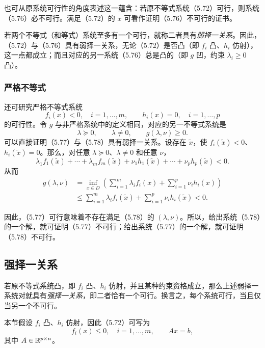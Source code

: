 也可从原系统可行性的角度表述这一蕴含：若原不等式系统（5.72）可行，则系统（5.76）必不可行。满足（5.72）的 $x$ 可看作证明（5.76）不可行的证书。

若两个不等式（和等式）系统至多有一个可行，就称二者具有\emph{弱择一关系}。因此，（5.72）与（5.76）具有弱择一关系，无论（5.72）是否凸（即 $f_i$ 凸、$h_i$ 仿射），这一点都成立；而且对应的另一系统（5.76）总是凸的（即 $g$ 凹，约束 $\lambda_i\ge0$ 凸）。

\subsubsection*{严格不等式}
还可研究严格不等式系统
\begin{equation}
f_i(x)<0,\quad i=1,\ldots,m,\qquad
h_i(x)=0,\quad i=1,\ldots,p\tag{5.77}
\end{equation}
的可行性。令 $g$ 与非严格系统中的定义相同，对应的另一不等式系统是
\begin{equation}
\lambda\succeq0,\qquad\lambda\ne0,\qquad g(\lambda,\nu)\ge0.\tag{5.78}
\end{equation}
可以直接证明（5.77）与（5.78）具有弱择一关系。设存在 $\widetilde x$，使 $f_i(\widetilde x)<0$、$h_i(\widetilde x)=0$。那么，对任意 $\lambda\succeq0$、$\lambda\ne0$ 和任意 $\nu$，
\[
\lambda_1 f_1(\widetilde x)+\cdots+\lambda_m f_m(\widetilde x)
+\nu_1h_1(\widetilde x)+\cdots+\nu_p h_p(\widetilde x)<0.
\]
从而
\[
\begin{aligned}
g(\lambda,\nu)&=\inf_{x\in D}\left(\sum_{i=1}^m\lambda_i f_i(x)+\sum_{i=1}^p\nu_i h_i(x)\right)\\
&\le\sum_{i=1}^m\lambda_i f_i(\widetilde x)+\sum_{i=1}^p\nu_i h_i(\widetilde x)<0.
\end{aligned}
\]

因此，（5.77）可行意味着不存在满足（5.78）的 $(\lambda,\nu)$。所以，给出系统（5.78）的一个解，就可证明（5.77）不可行；给出系统（5.77）的一个解，就可证明（5.78）不可行。

\subsection{强择一关系}
若原不等式系统凸，即 $f_i$ 凸、$h_i$ 仿射，并且某种约束资格成立，那么上述弱择一系统对就具有\emph{强择一关系}，即二者恰有一个可行。换言之，每个系统可行，当且仅当另一个不可行。

本节假设 $f_i$ 凸、$h_i$ 仿射，因此（5.72）可写为
\[
f_i(x)\le0,\quad i=1,\ldots,m,\qquad Ax=b,
\]
其中 $A\in\mathbb R^{p\times n}$。

